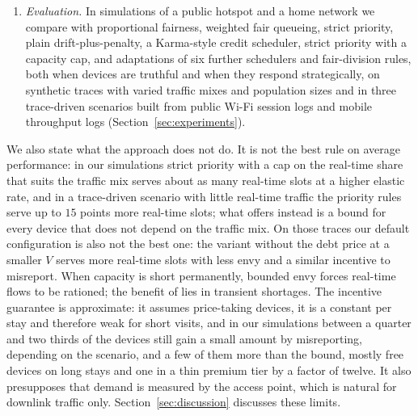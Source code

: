 \begin{enumerate}[leftmargin=*,itemsep=2pt]
\item \emph{Evaluation.} In simulations of a public hotspot and a home network we compare \repay{} with proportional fairness, weighted fair queueing, strict priority, plain drift-plus-penalty, a Karma-style credit scheduler, strict priority with a capacity cap, and adaptations of six further schedulers and fair-division rules, both when devices are truthful and when they respond strategically, on synthetic traces with varied traffic mixes and population sizes and in three trace-driven scenarios built from public Wi-Fi session logs and mobile throughput logs (Section~\ref{sec:experiments}).
\end{enumerate}

We also state what the approach does not do. It is not the best rule on average performance: in our simulations strict priority with a cap on the real-time share that suits the traffic mix serves about as many real-time slots at a higher elastic rate, and in a trace-driven scenario with little real-time traffic the priority rules serve up to $15$ points more real-time slots; what \repay{} offers instead is a bound for every device that does not depend on the traffic mix. On those traces our default configuration is also not the best one: the variant without the debt price at a smaller $V$ serves more real-time slots with less envy and a similar incentive to misreport. When capacity is short permanently, bounded envy forces real-time flows to be rationed; the benefit of \repay{} lies in transient shortages. The incentive guarantee is approximate: it assumes price-taking devices, it is a constant per stay and therefore weak for short visits, and in our simulations between a quarter and two thirds of the devices still gain a small amount by misreporting, depending on the scenario, and a few of them more than the bound, mostly free devices on long stays and one in a thin premium tier by a factor of twelve. It also presupposes that demand is measured by the access point, which is natural for downlink traffic only.
Section~\ref{sec:discussion} discusses these limits.

